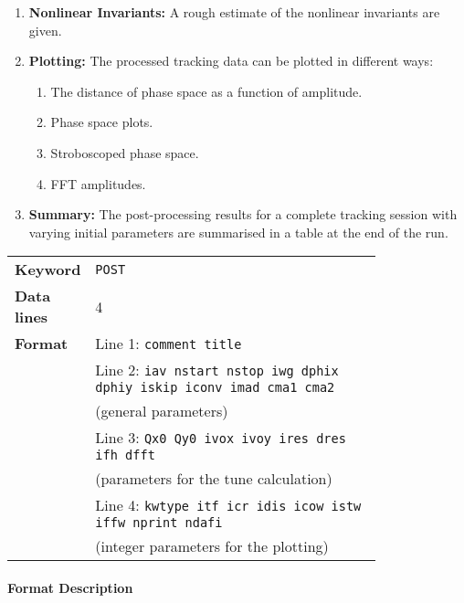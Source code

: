 \begin{enumerate}
    \item \textbf{Nonlinear Invariants:} A rough estimate of the nonlinear invariants are given.
    \item \textbf{Plotting:} The processed tracking data can be plotted in different ways:
    \begin{enumerate}
        \item The distance of phase space as a function of amplitude.
        \item Phase space plots.
        \item Stroboscoped phase space.
        \item FFT amplitudes.
    \end{enumerate}
    \item \textbf{Summary:} The post-processing results for a complete tracking session with varying initial parameters are summarised in a table at the end of the run.
\end{enumerate}

\bigskip
\begin{tabular}{@{}lp{0.8\linewidth}}
    \textbf{Keyword}    & \texttt{POST} \\
    \textbf{Data lines} & 4 \\
    \textbf{Format}     & Line 1: \texttt{comment title} \\
                        & Line 2: \texttt{iav nstart nstop iwg dphix dphiy iskip iconv imad cma1 cma2} \\
                        & (general parameters) \\
                        & Line 3: \texttt{Qx0 Qy0 ivox ivoy ires dres ifh dfft} \\
                        & (parameters for the tune calculation) \\
                        & Line 4: \texttt{kwtype itf icr idis icow istw iffw nprint ndafi} \\
                        & (integer parameters for the plotting)
\end{tabular}

\paragraph{Format Description}~

